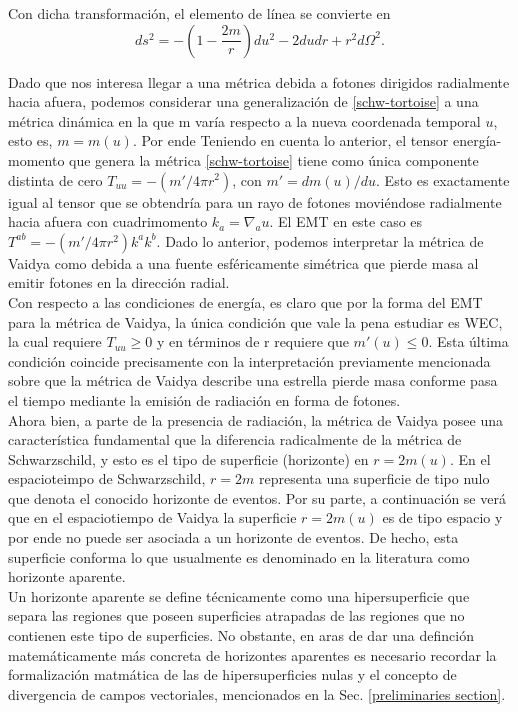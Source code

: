 \documentclass[16pt,a4paper]{article}
\numberwithin{equation}{section}
\theoremstyle{definition}
\begin{document}
Con dicha transformación, el elemento de línea se convierte en 
\begin{equation}
\label{schw-tortoise}
ds^2 = - \left(1- \frac{2m}{r}\right)du^2 - 2dudr + r^2d\Omega^2.
\end{equation}

Dado que nos interesa llegar a una métrica debida a fotones dirigidos radialmente hacia afuera, podemos considerar una generalización de \eqref{schw-tortoise} a una métrica dinámica en la que m varía respecto a la nueva coordenada temporal $u$, esto es, $m = m(u)$. Por ende Teniendo en cuenta lo anterior, el tensor energía-momento que genera la métrica \eqref{schw-tortoise} tiene como única componente distinta de cero $T_{uu} = -(m'/4 \pi r^2)$, con $m' = dm(u)/du$. Esto es exactamente igual al tensor que se obtendría para un rayo de fotones moviéndose radialmente hacia afuera con cuadrimomento $k_{a} = \nabla_{a}u$. El EMT en este caso es $T^{ab} = -(m'/4 \pi r^2)k^{a}k^{b}$. Dado lo anterior, podemos interpretar la métrica de Vaidya como debida a una fuente esféricamente simétrica que pierde masa al emitir fotones en la dirección radial.\\

Con respecto a las condiciones de energía, es claro que por la forma del EMT para la métrica de Vaidya, la única condición que vale la pena estudiar es WEC, la cual requiere $T_{uu} \geq 0$ y en términos de r requiere que $m'(u)\leq 0 $. Esta última condición coincide precisamente con la interpretación previamente mencionada sobre que la métrica de Vaidya describe una estrella pierde masa conforme pasa el tiempo mediante la emisión de radiación en forma de fotones.\\

Ahora bien, a parte de la presencia de radiación, la métrica de Vaidya posee una característica fundamental que la diferencia radicalmente de la métrica de Schwarzschild, y esto es el tipo de superficie (horizonte) en $r = 2m(u)$. En el espacioteimpo de Schwarzschild, $r = 2m$ representa una superficie de tipo nulo que denota el conocido horizonte de eventos. Por su parte, a continuación se verá que en el espaciotiempo de Vaidya la superficie $r = 2m(u)$ es de tipo espacio y por ende no puede ser asociada a un horizonte de eventos. De hecho, esta superficie conforma lo que usualmente es denominado en la literatura \cite{blau,griffiths2009,wald2010} como horizonte aparente.\\


Un horizonte aparente se define técnicamente como una hipersuperficie que separa las regiones que poseen superficies atrapadas de las regiones que no contienen este tipo de superficies. No obstante, en aras de dar una definción matemáticamente más concreta de horizontes aparentes es necesario recordar la formalización matmática de las de hipersuperficies nulas y el concepto de divergencia de campos vectoriales, mencionados en la Sec. \ref{preliminaries section}.\\
\end{document}

